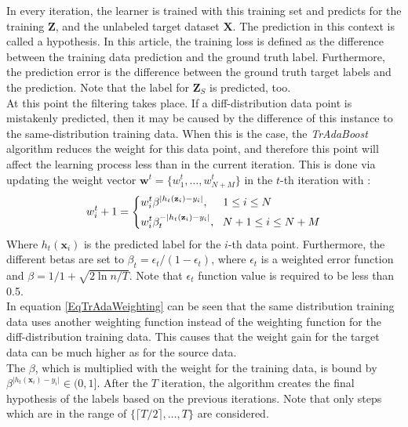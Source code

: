 In every iteration, the learner is trained with this training set and predicts for the training $\mathbf{Z}$, and the unlabeled target dataset $\mathbf{X}$.
The prediction in this context is called a hypothesis.
In this article, the training loss is defined as the difference between the training data prediction and the ground truth label.
Furthermore, the prediction error is the difference between the ground truth target labels and the prediction.
Note that the label for $\mathbf{Z}_S$ is predicted, too.\cite{Dai.}\\
At this point the filtering takes place.
If a diff-distribution data point is mistakenly predicted, then it may be caused by the difference of this instance to the same-distribution training data.
When this is the case, the \textit{TrAdaBoost} algorithm reduces the weight for this data point, and therefore this point will affect the learning process less than in the current iteration.
This is done via updating the weight vector $\mathbf{w}^t=\{w_1^t,\dots,w_{N+M}^t\}$ in the $t$-th iteration with \cite{Dai.}:
\begin{equation}\label{EqTrAdaWeighting}
	w_i^t+1=\begin{dcases}
				w_i^t\beta^{\vert h_t(\mathbf{z}_i )-y_i\vert}, \>\>\>\>\>\> 1\le i \le N \\
				w_i^t\beta_t^{-\vert h_t(\mathbf{z}_i )-y_i\vert}, \>\>\> N+1\le i \le N+M
			 \end{dcases}
\end{equation}
Where $ h_t(\mathbf{x}_i )$ is the predicted label for the $i$-th data point.
Furthermore, the different betas are set to $\beta_t = \epsilon_t / (1-\epsilon_t)$, where $\epsilon_t$ is a weighted error function and $\beta= 1 / 1 + \sqrt{2\ln n/T}$.
Note that $\epsilon_t$ function value is required to be less than 0.5.\\
In equation \eqref{EqTrAdaWeighting} can be seen that the same distribution training data uses another weighting function instead of the weighting function for the diff-distribution training data.
This causes that the weight gain for the target data can be much higher as for the source data.\\
The $\beta$, which is multiplied with the weight for the training data, is bound by $\beta^{\vert h_t(\mathbf{x}_i )-y_i\vert} \in (0,1]$.
After the $T$ iteration, the algorithm creates the final hypothesis of the labels based on the previous iterations.
Note that only steps which are in the range of $\{\lceil T /2 \rceil,\dots,T\}$ are considered.\cite{Dai.}\\
